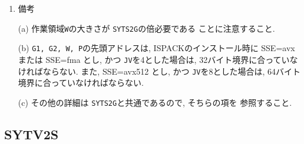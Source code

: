 \documentclass[a4j]{jsarticle}
\begin{document}
\begin{enumerate}
\item 備考

(a) 作業領域\texttt{W}の大きさが \texttt{SYTS2G}の倍必要である
      ことに注意すること.

(b) \texttt{G1, G2, W, P}の先頭アドレスは, 
ISPACKのインストール時に SSE=avx または SSE=fma とし, かつ
\texttt{JV}を4とした場合は, 32バイト境界に合っていなければならない.
また, SSE=avx512 とし, かつ
\texttt{JV}を8とした場合は, 64バイト境界に合っていなければならない.

(c) その他の詳細は \texttt{SYTS2G}と共通であるので, そちらの項を
参照すること.

\end{enumerate}


\subsection{SYTV2S}
\end{document}
